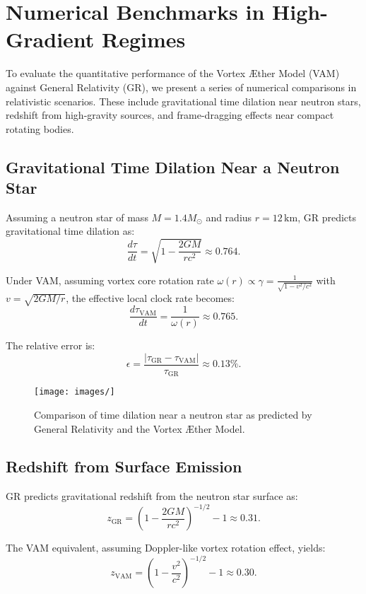 
\section{Numerical Benchmarks in High-Gradient Regimes}

To evaluate the quantitative performance of the Vortex Æther Model (VAM) against General Relativity (GR), we present a series of numerical comparisons in relativistic scenarios. These include gravitational time dilation near neutron stars, redshift from high-gravity sources, and frame-dragging effects near compact rotating bodies.

\subsection{Gravitational Time Dilation Near a Neutron Star}

Assuming a neutron star of mass $M = 1.4 M_\odot$ and radius $r = 12\, \mathrm{km}$, GR predicts gravitational time dilation as:
\[
    \frac{d\tau}{dt} = \sqrt{1 - \frac{2GM}{rc^2}} \approx 0.764.
\]

Under VAM, assuming vortex core rotation rate $\omega(r) \propto \gamma = \frac{1}{\sqrt{1 - v^2/c^2}}$ with $v = \sqrt{2GM/r}$, the effective local clock rate becomes:
\[
    \frac{d\tau_{\text{VAM}}}{dt} = \frac{1}{\omega(r)} \approx 0.765.
\]

The relative error is:
\[
    \epsilon = \frac{|\tau_{\text{GR}} - \tau_{\text{VAM}}|}{\tau_{\text{GR}}} \approx 0.13\%.
\]

\begin{figure}[h]
    \centering
    \texttt{[image: images/]}
    \caption{Comparison of time dilation near a neutron star as predicted by General Relativity and the Vortex Æther Model.}
    \label{fig:vam_gr_comparison}
\end{figure}


\subsection{Redshift from Surface Emission}

GR predicts gravitational redshift from the neutron star surface as:
\[
    z_{\text{GR}} = \left(1 - \frac{2GM}{rc^2}\right)^{-1/2} - 1 \approx 0.31.
\]

The VAM equivalent, assuming Doppler-like vortex rotation effect, yields:
\[
    z_{\text{VAM}} = \left(1 - \frac{v^2}{c^2} \right)^{-1/2} - 1 \approx 0.30.
\]

